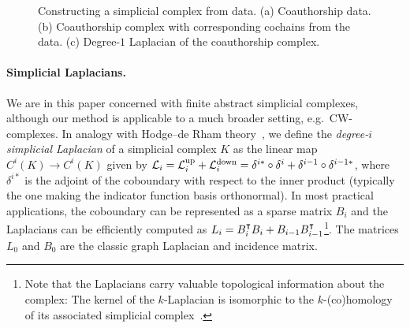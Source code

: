 \begin{figure}[htpb]
{
}%
\settowidth{\tempwidth}{\usebox{\tempbox}}%
\hfil\begin{minipage}[b]{\tempwidth}%
\raisebox{-\height}{\usebox{\tempbox}}%
\scriptsize{}%
\label{fig:co-authoship-complex}%
\end{minipage}%
\vspace{5pt}
%
\settowidth{\tempwidth}{\usebox{\tempbox}}%
\hfil\begin{minipage}[b]{\tempwidth}%
\raisebox{-\height}{\usebox{\tempbox}}%
\scriptsize{}%
\end{minipage}%

\caption{Constructing a simplicial complex from data. (a) Coauthorship data. (b) Coauthorship complex with corresponding cochains from the data. (c) Degree-$1$ Laplacian of the coauthorship complex.}\label{fig:data2complex}
\end{figure}


\paragraph{Simplicial Laplacians.}
We are in this paper concerned with finite abstract simplicial complexes, although our method is applicable to a much broader setting, e.g.\ CW-complexes. In analogy with Hodge--de Rham theory~\cite{madsen1997calculus}, we define the \emph{degree-$i$ simplicial Laplacian} of a simplicial complex $K$ as the linear map $C^i(K)\to C^i(K)$ given by $\mathcal{L}_i = \mathcal{L}^{\text{up}}_i + \mathcal{L}^{\text{down}}_i = \delta^{i\ast}\circ\delta^{i} + \delta^{i-1}\circ\delta^{i-1\ast}$, where $\delta^{i\ast}$ is the adjoint of the coboundary with respect to the inner product (typically the one making the indicator function basis orthonormal). In most practical applications, the coboundary can be represented as a sparse matrix $B_i$ and the Laplacians can be efficiently computed as $L_i=B_i^{\intercal} B_{i}+B_{i-1}B_{i-1}^{\intercal}$\footnote{Note that the Laplacians carry valuable topological information about the complex: The kernel of the $k$-Laplacian is isomorphic to the $k$-(co)homology of its associated simplicial complex~\cite{eckmann1944,horak2013spectra}.}. The matrices $L_0$ and $B_0$ are the classic graph Laplacian and incidence matrix.

